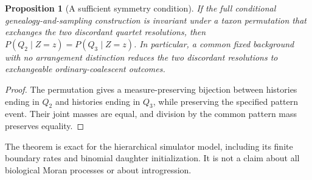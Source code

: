 \documentclass[11pt]{article}
\newtheorem{proposition}{Proposition}
\begin{document}
\begin{proposition}[A sufficient symmetry condition]
If the full conditional genealogy-and-sampling construction is invariant under
a taxon permutation that exchanges the two discordant quartet resolutions,
then $P(Q_2\mid Z=z)=P(Q_3\mid Z=z)$. In particular, a common fixed
background with no arrangement distinction reduces the two discordant
resolutions to exchangeable ordinary-coalescent outcomes.
\end{proposition}

\begin{proof}
The permutation gives a measure-preserving bijection between histories ending
in $Q_2$ and histories ending in $Q_3$, while preserving the specified pattern
event. Their joint masses are equal, and division by the common pattern mass
preserves equality.
\end{proof}

The theorem is exact for the hierarchical simulator model, including its
finite boundary rates and binomial daughter initialization. It is not a claim
about all biological Moran processes or about introgression.
\end{document}
